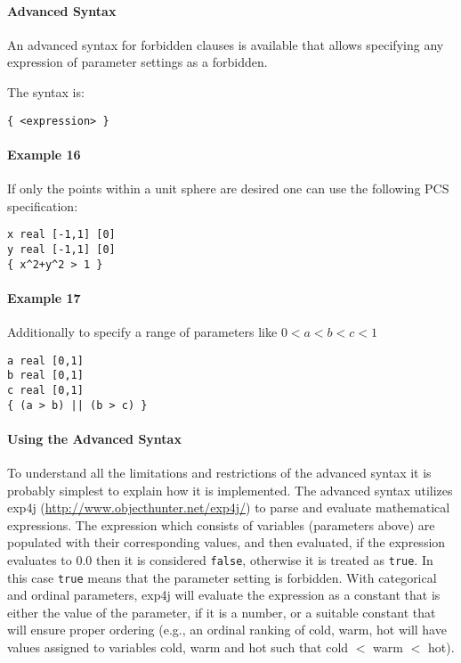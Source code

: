 \documentclass[manual.tex]{subfiles}
\begin{document}
\paragraph{Advanced Syntax}

An advanced syntax for forbidden clauses is available that allows specifying any expression of parameter settings as a forbidden.

The syntax is:

\begin{verbatim}
{ <expression> }
\end{verbatim}

\paragraph{Example 16}
If only the points within a unit sphere are desired one can use the following PCS specification:

\begin{verbatim}
x real [-1,1] [0]
y real [-1,1] [0]
{ x^2+y^2 > 1 }
\end{verbatim}

\paragraph{Example 17}
Additionally to specify a range of parameters like $ 0 < a < b < c < 1 $

\begin{verbatim}
a real [0,1]
b real [0,1]
c real [0,1]
{ (a > b) || (b > c) }
\end{verbatim}


\paragraph{Using the Advanced Syntax}

To understand all the limitations and restrictions of the advanced syntax it is probably simplest to explain how it is implemented. The advanced syntax utilizes exp4j (\url{http://www.objecthunter.net/exp4j/}) to parse and evaluate mathematical expressions.  The expression which consists of variables (parameters above) are populated with their corresponding values, and then evaluated, if the expression evaluates to 0.0 then it is considered \texttt{false}, otherwise it is treated as \texttt{true}. In this case \texttt{true} means that the parameter setting is forbidden.  With categorical and ordinal parameters, exp4j will evaluate the expression as a constant that is either the value of the parameter, if it is a number, or a suitable constant that will ensure proper ordering (e.g., an ordinal ranking of cold, warm, hot will have values assigned to variables cold, warm and hot such that cold $<$ warm $<$ hot). 
\end{document}
